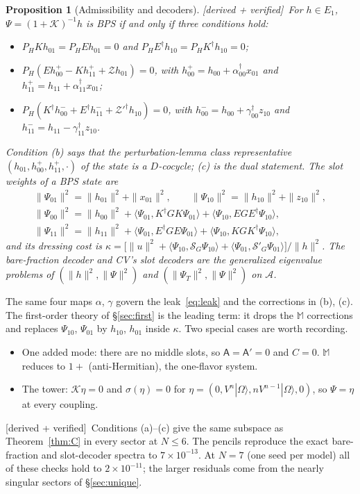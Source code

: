 \documentclass[11pt]{article}
\newcommand{\ip}[2]{\langle #1,#2\rangle}
\newcommand{\PH}{P_{\!H}}
\newcommand{\Om}{|\Omega\rangle}
\newcommand{\Zc}{\mathcal Z}
\newcommand{\Kc}{\mathcal K}
\newcommand{\Mb}{\mathbb M}
\newcommand{\SG}{\mathcal S_G}
\newcommand{\SGp}{\mathcal S'_G}
\newcommand{\tagbox}[2]{\textsf{\small\color{#1}[#2]}}
\newcommand{\VER}{\tagbox{cder}{derived + verified}}
\theoremstyle{plain}
\newtheorem{proposition}{Proposition}
\theoremstyle{remark}
\numberwithin{equation}{section}
\begin{document}
\begin{proposition}[Admissibility and decoders]\label{prop:adm}\VER\
For $h\in E_1$, $\Psi=(1+\Kc)^{-1}h$ is BPS if and only if three conditions hold:
\begin{itemize}\itemsep2pt
\item[(a)] $\PH Kh_{01}=\PH Eh_{01}=0$ and $\PH E^\dagger h_{10}=\PH K^\dagger h_{10}=0$;
\item[(b)] $\PH(Eh_{00}^+-Kh_{11}^+ +\Zc h_{01})=0$, with $h_{00}^+=h_{00}+\alpha_{00}^\dagger x_{01}$ and
  $h_{11}^+=h_{11}+\alpha_{11}^\dagger x_{01}$;
\item[(c)] $\PH(K^\dagger h_{00}^-+E^\dagger h_{11}^-+\Zc'^\dagger h_{10})=0$, with
  $h_{00}^-=h_{00}+\gamma_{00}^\dagger z_{10}$ and $h_{11}^-=h_{11}-\gamma_{11}^\dagger z_{10}$.
\end{itemize}
Condition (b) says that the perturbation-lemma class representative $(h_{01},h_{00}^+,h_{11}^+,\cdot)$ of the state is a
$D$-cocycle; (c) is the dual statement. The slot weights of a BPS state are
\begin{gather}
\|\Psi_{01}\|^2=\|h_{01}\|^2+\|x_{01}\|^2,\qquad \|\Psi_{10}\|^2=\|h_{10}\|^2+\|z_{10}\|^2,\nonumber\\
\|\Psi_{00}\|^2=\|h_{00}\|^2+\ip{\Psi_{01}}{K^\dagger GK\Psi_{01}}+\ip{\Psi_{10}}{EGE^\dagger\Psi_{10}},\nonumber\\
\|\Psi_{11}\|^2=\|h_{11}\|^2+\ip{\Psi_{01}}{E^\dagger GE\Psi_{01}}+\ip{\Psi_{10}}{KGK^\dagger\Psi_{10}},
\label{eq:weights}
\end{gather}
and its dressing cost is $\kappa=\big[\|u\|^2+\ip{\Psi_{10}}{\SG\Psi_{10}}+\ip{\Psi_{01}}{\SGp\Psi_{01}}\big]/\|h\|^2$.
The bare-fraction decoder and CV's slot decoders are the generalized eigenvalue problems of
$(\|h\|^2,\|\Psi\|^2)$ and $(\|\Psi_T\|^2,\|\Psi\|^2)$ on $\mathcal A$.
\end{proposition}

The same four maps $\alpha$, $\gamma$ govern the leak~\eqref{eq:leak} and the corrections in (b), (c). The first-order
theory of \S\ref{sec:first} is the leading term: it drops the $\Mb$ corrections and replaces $\Psi_{10}$, $\Psi_{01}$
by $h_{10}$, $h_{01}$ inside $\kappa$. Two special cases are worth recording.
\begin{itemize}\itemsep2pt
\item One added mode: there are no middle slots, so $\mathsf A=\mathsf A'=0$ and $C=0$. $\Mb$ reduces to $1+$
  (anti-Hermitian), the one-flavor system.
\item The tower: $\Kc\eta=0$ and $\sigma(\eta)=0$ for $\eta=(0,V^n\Om,nV^{n-1}\Om,0)$, so $\Psi=\eta$ at every
  coupling.
\end{itemize}
\VER\ Conditions (a)--(c) give the same subspace as Theorem~\ref{thm:C} in every sector at $N\le6$. The pencils
reproduce the exact bare-fraction and slot-decoder spectra to $7\times10^{-13}$. At $N=7$ (one seed per model) all of
these checks hold to $2\times10^{-11}$; the larger residuals come from the nearly singular sectors of
\S\ref{sec:unique}.
\end{document}
